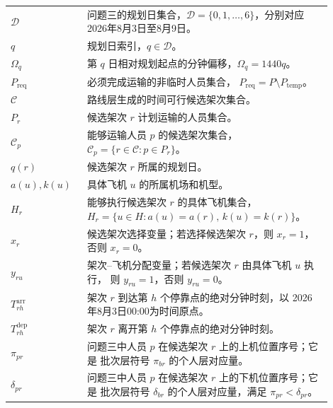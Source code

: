 \documentclass[UTF8,a4paper,zihao=5]{ctexart}
\begin{document}
\begin{longtable}{
    >{\centering\arraybackslash}p{0.20\linewidth}
    p{0.70\linewidth}
}
$\mathcal{D}$
& 问题三的规划日集合，$\mathcal{D}=\{0,1,\ldots,6\}$，分别对应
2026年8月3日至8月9日。 \\

$q$
& 规划日索引，$q\in\mathcal{D}$。 \\

$\Omega_q$
& 第 $q$ 日相对规划起点的分钟偏移，$\Omega_q=1440q$。 \\

$P_{\mathrm{req}}$
& 必须完成运输的非临时人员集合，
$P_{\mathrm{req}}=P\setminus P_{\mathrm{temp}}$。 \\

$\mathcal{C}$
& 路线层生成的时间可行候选架次集合。 \\

$P_r$
& 候选架次 $r$ 计划运输的人员集合。 \\

$\mathcal{C}_p$
& 能够运输人员 $p$ 的候选架次集合，
$\mathcal{C}_p=\{r\in\mathcal{C}:p\in P_r\}$。 \\

$q(r)$
& 候选架次 $r$ 所属的规划日。 \\

$a(u),k(u)$
& 具体飞机 $u$ 的所属机场和机型。 \\

$H_r$
& 能够执行候选架次 $r$ 的具体飞机集合，
$H_r=\{u\in H:a(u)=a(r),\,k(u)=k(r)\}$。 \\

$x_r$
& 候选架次选择变量；若选择候选架次 $r$，则 $x_r=1$，
否则 $x_r=0$。 \\

$y_{ru}$
& 架次--飞机分配变量；若候选架次 $r$ 由具体飞机 $u$ 执行，
则 $y_{ru}=1$，否则 $y_{ru}=0$。 \\

$T_{rh}^{\mathrm{arr}}$
& 架次 $r$ 到达第 $h$ 个停靠点的绝对分钟时刻，以
2026年8月3日00:00为时间原点。 \\

$T_{rh}^{\mathrm{dep}}$
& 架次 $r$ 离开第 $h$ 个停靠点的绝对分钟时刻。 \\

$\pi_{pr}$
& 问题三中人员 $p$ 在候选架次 $r$ 上的上机位置序号；它是
批次层符号 $\pi_{br}$ 的个人层对应量。 \\

$\delta_{pr}$
& 问题三中人员 $p$ 在候选架次 $r$ 上的下机位置序号；它是
批次层符号 $\delta_{br}$ 的个人层对应量，满足 $\pi_{pr}<\delta_{pr}$。 \\


\end{longtable}
\end{document}

